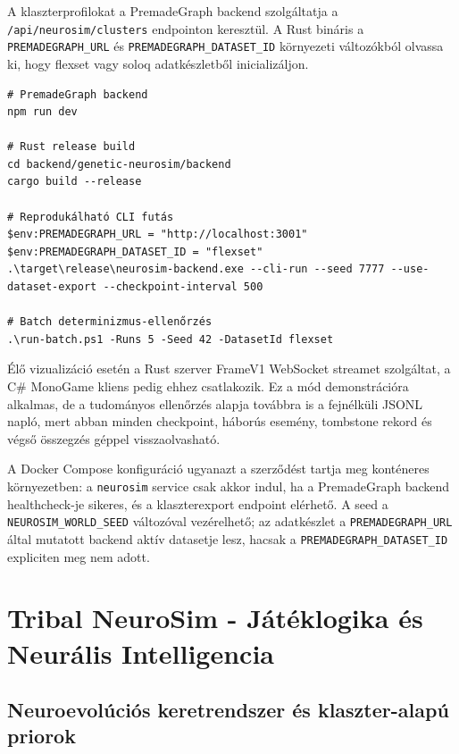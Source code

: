﻿\documentclass[a4paper,12pt]{report}
\begin{document}
A klaszterprofilokat a PremadeGraph backend szolgáltatja a
\texttt{/api/neurosim/clusters} endpointon keresztül. A Rust bináris a
\texttt{PREMADEGRAPH\_URL} és \texttt{PREMADEGRAPH\_DATASET\_ID} környezeti
változókból olvassa ki, hogy flexset vagy soloq adatkészletből inicializáljon.

\begin{lstlisting}[language={},basicstyle=\ttfamily\scriptsize,breaklines=true,caption={Egy helyre gyűjtött fejlesztői futtatási parancsok}]
# PremadeGraph backend
npm run dev

# Rust release build
cd backend/genetic-neurosim/backend
cargo build --release

# Reprodukálható CLI futás
$env:PREMADEGRAPH_URL = "http://localhost:3001"
$env:PREMADEGRAPH_DATASET_ID = "flexset"
.\target\release\neurosim-backend.exe --cli-run --seed 7777 --use-dataset-export --checkpoint-interval 500

# Batch determinizmus-ellenőrzés
.\run-batch.ps1 -Runs 5 -Seed 42 -DatasetId flexset
\end{lstlisting}

Élő vizualizáció esetén a Rust szerver FrameV1 WebSocket streamet szolgáltat,
a C\# MonoGame kliens pedig ehhez csatlakozik. Ez a mód demonstrációra alkalmas,
de a tudományos ellenőrzés alapja továbbra is a fejnélküli JSONL napló, mert abban
minden checkpoint, háborús esemény, tombstone rekord és végső összegzés
géppel visszaolvasható.

A Docker Compose konfiguráció ugyanazt a szerződést tartja meg konténeres környezetben:
a \texttt{neurosim} service csak akkor indul, ha a PremadeGraph backend healthcheck-je
sikeres, és a klaszterexport endpoint elérhető.
A seed a \texttt{NEUROSIM\_WORLD\_SEED} változóval vezérelhető;
az adatkészlet a \texttt{PREMADEGRAPH\_URL} által mutatott backend aktív datasetje lesz,
hacsak a \texttt{PREMADEGRAPH\_DATASET\_ID} expliciten meg nem adott.

\bigskip

\chapter{Tribal NeuroSim - Játéklogika és Neurális Intelligencia}

\section{Neuroevolúciós keretrendszer és klaszter-alapú priorok}
\label{sec:neurosim-25-neat}
\end{document}
